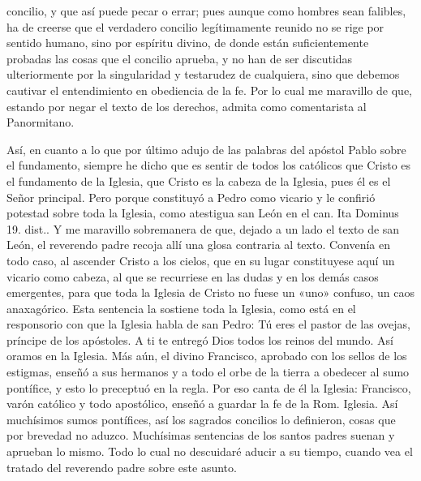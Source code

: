 concilio, y que así puede pecar o errar; pues aunque como hombres sean falibles, ha de creerse que el verdadero concilio legítimamente reunido no se rige por sentido humano, sino por espíritu divino, de donde están suficientemente probadas las cosas que el concilio aprueba, y no han de ser discutidas ulteriormente por la singularidad y testarudez de cualquiera, sino que debemos cautivar el entendimiento en obediencia de la fe. Por lo cual me maravillo de que, estando por negar el texto de los derechos, admita como comentarista al Panormitano.

Así, en cuanto a lo que por último adujo de las palabras del apóstol Pablo sobre el fundamento, siempre he dicho que es sentir de todos los católicos que Cristo es el fundamento de la Iglesia, que Cristo es la cabeza de la Iglesia, pues él es el Señor principal. Pero porque constituyó a Pedro como vicario y le confirió potestad sobre toda la Iglesia, como atestigua san León en el can. Ita Dominus 19. dist.. Y me maravillo sobremanera de que, dejado a un lado el texto de san León, el reverendo padre recoja allí una glosa contraria al texto. Convenía en todo caso, al ascender Cristo a los cielos, que en su lugar constituyese aquí un vicario como cabeza, al que se recurriese en las dudas y en los demás casos emergentes, para que toda la Iglesia de Cristo no fuese un «uno» confuso, un caos anaxagórico. Esta sentencia la sostiene toda la Iglesia, como está en el responsorio con que la Iglesia habla de san Pedro: Tú eres el pastor de las ovejas, príncipe de los apóstoles. A ti te entregó Dios todos los reinos del mundo. Así oramos en la Iglesia. Más aún, el divino Francisco, aprobado con los sellos de los estigmas, enseñó a sus hermanos y a todo el orbe de la tierra a obedecer al sumo pontífice, y esto lo preceptuó en la regla. Por eso canta de él la Iglesia: Francisco, varón católico y todo apostólico, enseñó a guardar la fe de la Rom. Iglesia. Así muchísimos sumos pontífices, así los sagrados concilios lo definieron, cosas que por brevedad no aduzco. Muchísimas sentencias de los santos padres suenan y aprueban lo mismo. Todo lo cual no descuidaré aducir a su tiempo, cuando vea el tratado del reverendo padre sobre este asunto.

